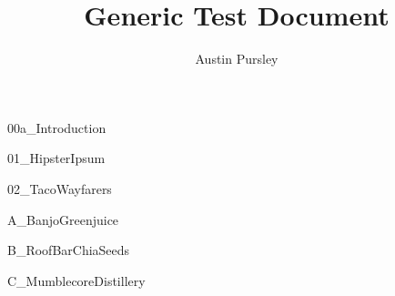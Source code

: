\documentclass{myArticleClass}
\title{Generic Test Document}
\author{Austin Pursley}
\begin{document}
 	
	\maketitle
	
	\clearpage
	{00a_Introduction}

	\clearpage
	\tableofcontents
    	\newpage
    	\begin{center}
    	\lhead{}
   	\listoftables
   	\newpage
   	\listoffigures
   	\end{center}
 	\clearpage
	

	\glsresetall %

	\clearpage
	{01_HipsterIpsum}

	\clearpage
	{02_TacoWayfarers}

	\clearpage
	\printbibliography[heading=bibnumbered,title={References}]
    

	\clearpage
	\renewcommand{\appendixpagename}{\center{\Large{Appendices}}}
	\appendix
	\begin{appendices}
	\glsresetall %

	\clearpage
	{A_BanjoGreenjuice}

	\clearpage
	{B_RoofBarChiaSeeds}

	\clearpage
	{C_MumblecoreDistillery}

	\clearpage
	\printglossary[type=main,style=list]
	\printglossary[type=abbreviations, title={Acronyms}]
	\end{appendices}

	
\end{document}
